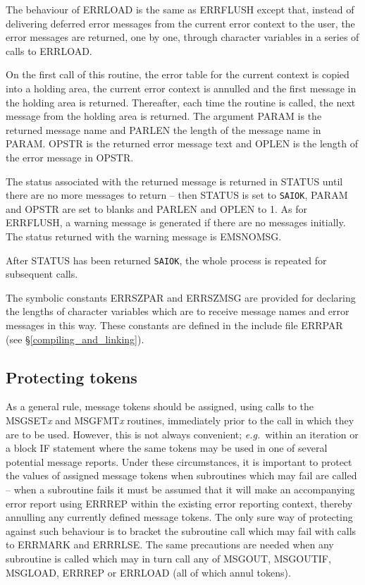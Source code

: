 \documentclass[twoside,11pt]{article}
\newcommand{\htmlref}[2]{#1}
\newcommand{\latex}[1]{#1}
\newcommand{\xlabel}[1]{}
\renewcommand{\_}{\texttt{\symbol{95}}}
\newcommand{\const}[1]{\texttt{#1}}
\newcommand{\saiok}{\const{SAI\_\_OK}}
\begin{document}
The behaviour of ERR\_LOAD is the same as ERR\_FLUSH except that, instead of
delivering deferred error messages from the current error context to the
user, the error messages are returned, one by one, through character variables
in a series of calls to ERR\_LOAD. 

On the first call of this routine, the error table for the current 
context is copied into a holding area, the current error context
is annulled and the first message in the holding area is returned.
Thereafter, each time the routine is called, the next message from 
the holding area is returned.
The argument PARAM is the returned message name and PARLEN the length of the
message name in PARAM.
OPSTR is the returned error message text and OPLEN is the length of
the error message in OPSTR.

The status associated with the returned message is returned in STATUS
until there are no more messages to return -- then STATUS is set to
\saiok, PARAM and OPSTR are set to blanks and PARLEN and OPLEN to 1.
As for ERR\_FLUSH, a warning message is generated if there are no messages
initially. The status returned with the warning message is EMS\_\_NOMSG.

After STATUS has been returned \saiok, the whole process is repeated
for subsequent calls.

The symbolic constants ERR\_\_SZPAR and ERR\_\_SZMSG are provided for 
declaring the lengths of character variables which are to receive message 
names and error messages in this way.
These constants are defined in the include file 
\htmlref
{ERR\_PAR}{compiling_and_linking}\latex{ (see \S\ref{compiling_and_linking})}.

\subsection{\xlabel{protecting_tokens}Protecting tokens}
As a general rule, message tokens should be assigned, using calls to the
MSG\_SET\textit{x} and MSG\_FMT\textit{x} routines, immediately prior to the call 
in which they are to be used.
However, this is not always convenient; \textit{e.g.}\ within an iteration 
or a block IF statement where the same tokens may be used in one of several
potential message reports.
Under these circumstances, it is important to protect the values of assigned
message tokens when subroutines which may fail are called -- when a subroutine
fails it must be assumed that it will make an accompanying error report
using ERR\_REP within the existing error reporting context, thereby annulling
any currently defined message tokens.
The only sure way of protecting against such behaviour is to bracket the 
subroutine call which may fail with calls to ERR\_MARK and ERR\_RLSE.
The same precautions are needed when any subroutine is called which
may in turn call any of MSG\_OUT, MSG\_OUTIF, MSG\_LOAD, ERR\_REP or ERR\_LOAD
(all of which annul tokens).
\end{document}
